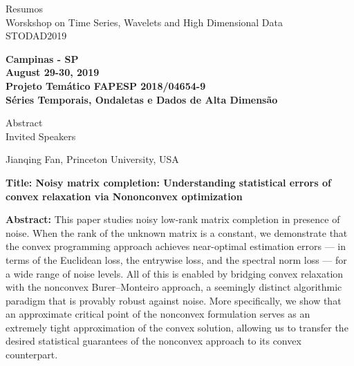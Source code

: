 \documentclass[11pt]{article}
\begin{document}
\thispagestyle{empty}
\begin{center}
  {\sc \Large Resumos}\\
  \vspace*{2cm} {\Huge \sc Worskshop on Time Series, Wavelets and High
    Dimensional Data \\ \vspace*{1cm} STODAD2019}
\end{center}
\vspace*{.2cm}
\begin{center} {\Large \bf
    Campinas - SP \\
    August 29-30,  2019\\
    \vspace*{1cm} Projeto Tem\'atico FAPESP 2018/04654-9 \\ {\bf
      S\'eries Temporais, Ondaletas e Dados de Alta Dimens\~ao}}
\end{center}
\newpage\vspace*{5cm}
\begin{center}
  {\sc \Huge Abstract \\
    Invited Speakers }
\end{center}



\newpage


{\large \sc Jianqing Fan, Princeton University, USA}


{\bf Title: Noisy matrix completion: Understanding statistical errors
  of convex relaxation via Nononconvex optimization}

{\bf Abstract:} This paper studies noisy low-rank matrix completion in
presence of noise.  When the rank of the unknown matrix is a constant,
we demonstrate that the convex programming approach achieves
near-optimal estimation errors --- in terms of the Euclidean loss, the
entrywise loss, and the spectral norm loss --- for a wide range of
noise levels.  All of this is enabled by bridging convex relaxation
with the nonconvex Burer--Monteiro approach, a seemingly distinct
algorithmic paradigm that is provably robust against noise.  More
specifically, we show that an approximate critical point of the
nonconvex formulation serves as an extremely tight approximation of
the convex solution, allowing us to transfer the desired statistical
guarantees of the nonconvex approach to its convex counterpart.
\end{document}
